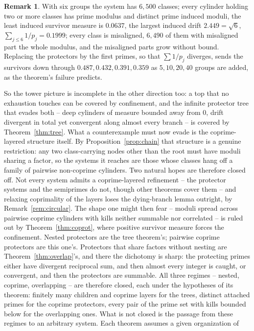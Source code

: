 \documentclass[11pt]{article}
\theoremstyle{plain}
\theoremstyle{definition}
\newtheorem{remark}[theorem]{Remark}
\begin{document}
\begin{remark}
With six groups the system has $6{,}500$ classes; every
cylinder holding two or more classes has prime modulus and
distinct prime induced moduli, the least induced survivor
measure is $0.0637$, the largest induced drift $2.449=\sqrt6$,
$\sum_{j\le6}1/p_j=0.1999$; every class is misaligned, $6{,}490$
of them with misaligned part the whole modulus, and the misaligned
parts grow without bound.
Replacing the protectors by the first primes, so that
$\sum1/p_j$ diverges, sends the survivors down through
$0.487,0.432,0.391,0.359$ as $5,10,20,40$ groups are added, as
the theorem's failure predicts.

So the tower picture is incomplete in the other direction too:
a top that no exhaustion touches can be covered by confinement,
and the infinite protector tree that evades both -- deep
cylinders of measure bounded away from $0$, drift divergent in
total yet convergent along almost every branch -- is covered by
Theorem~\ref{thm:tree}.  What a counterexample must now evade is
the coprime-layered structure itself.  By
Proposition~\ref{prop:chain} that structure is a genuine
restriction: any two class-carrying nodes other than the root
must have moduli sharing a factor, so the systems it reaches are
those whose classes hang off a family of pairwise non-coprime
cylinders.  Two natural
hopes are therefore closed off.  Not every system
admits a coprime-layered refinement -- the protector systems and
the semiprimes do not, though other theorems cover them -- and
relaxing coprimality of the layers loses the dying-branch lemma
outright, by Remark~\ref{rem:circular}.  The shape one might then fear -- moduli
spread across pairwise coprime cylinders with kills neither
summable nor correlated -- is ruled out by
Theorem~\ref{thm:coprot}, where positive survivor measure forces
the confinement.  Nested protectors are the tree theorem's;
pairwise coprime protectors are this one's.  Protectors that share factors
without nesting are Theorem~\ref{thm:overlap}'s, and there the
dichotomy is sharp: the protecting primes either have divergent
reciprocal sum, and then almost every integer is caught, or
convergent, and then the protectors are summable.  All three
regimes -- nested, coprime, overlapping -- are therefore closed,
each under the hypotheses of its theorem: finitely many children
and coprime layers for the trees, distinct attached primes for
the coprime protectors, every pair of the prime set with kills
bounded below for the overlapping ones.
What is not closed is the passage from these regimes to an
arbitrary system.  Each theorem assumes a given organization of

\end{remark}
\end{document}
